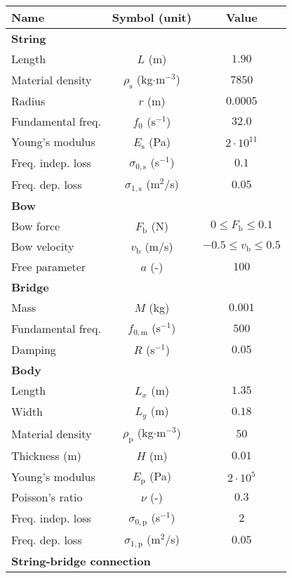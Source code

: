 \documentclass[dvipsnames, pdftex]{article}
\begin{document}
\begin{table}[t]
\small
\begin{center}
\begin{tabular}{|l|c|c|}
    \hline
    Name & Symbol (unit) & Value\\ \hline
    \multicolumn{3}{|l|}{\bf String}\\ \hline
    Length & $L$ (m) & $1.90$\\
    Material density & $\rho_\text{s}$ (kg$\cdot$m$^{-3}$) & $7850$\\ 
    Radius & $r$ (m) & $0.0005$\\
    Fundamental freq. & $f_0$ (s$^{-1}$)& $32.0$\\ 
    Young's modulus & $E_\text{s}$ (Pa) & $2\cdot 10^{11}$\\
    Freq. indep. loss & $\sigma_{0,\text{s}}$ (s$^{-1}$) & $0.1$\\ 
    Freq. dep. loss & $\sigma_{1,\text{s}}$ (m$^2$/s) & $0.05$\\ \hline
    \multicolumn{3}{|l|}{\bf Bow}\\ \hline
    Bow force & $F_\text{b}$ (N) & $0 \leq F_\text{b} \leq 0.1 $\\
    Bow velocity & $v_\text{b}$ (m/s) & $-0.5 \leq v_\text{b} \leq 0.5 $\\
    Free parameter & $a$ (-) & $100$\\\hline
    \multicolumn{3}{|l|}{\bf Bridge}\\ \hline
    Mass & $M$ (kg) & $0.001$\\ 
    Fundamental freq. & $f_{0,\text{m}}$ (s$^{-1}$) & $500$\\ 
    Damping & $R$ (s$^{-1}$)& $0.05$\\ \hline
    \multicolumn{3}{|l|}{\bf Body}\\ \hline
    Length & $L_x$ (m)& $1.35$\\ 
    Width & $L_y$ (m)& $0.18$\\ 
    Material density & $\rho_\text{p}$ (kg$\cdot$m$^{-3}$)& $50$\\ 
    Thickness (m) & $H$ (m) & $0.01$\\ 
    Young's modulus & $E_\text{p}$ (Pa) & $2\cdot 10^{5}$\\ 
    Poisson's ratio & $\nu$ (-)& $0.3$\\
    Freq. indep. loss & $\sigma_{0,\text{p}}$ (s$^{-1}$)& $2$\\
    Freq. dep. loss & $\sigma_{1,\text{p}}$ (m$^2$/s)& $0.05$\\ \hline
    \multicolumn{3}{|l|}{\bf String-bridge connection}\\\hline

\end{tabular}
\end{center}
\end{table}
\end{document}
